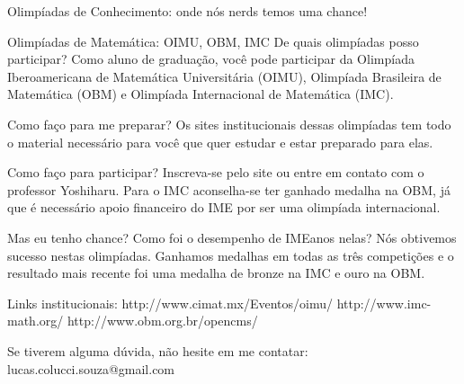 \begin{secao}{Olimpíadas de Conhecimento: onde nós nerds temos uma chance!}
\begin{subsecao}{Olimpíadas de Matemática: OIMU, OBM, IMC}
De quais olimpíadas posso participar? Como aluno de graduação, você pode
participar da Olimpíada Iberoamericana de Matemática Universitária (OIMU),
Olimpíada Brasileira de Matemática (OBM) e Olimpíada Internacional de 
Matemática (IMC).

Como faço para me preparar? Os sites institucionais dessas olimpíadas
tem todo o material necessário para você que quer estudar e estar preparado
para elas.

Como faço para participar? Inscreva-se pelo site ou entre em contato com
o professor Yoshiharu. Para o IMC aconselha-se ter ganhado medalha na OBM,
já que é necessário apoio financeiro do IME por ser uma olimpíada internacional.

Mas eu tenho chance? Como foi o desempenho de IMEanos nelas? Nós obtivemos
sucesso nestas olimpíadas. Ganhamos medalhas em todas as três competições e
o resultado mais recente foi uma medalha de bronze na IMC e ouro na OBM.

Links institucionais:
http://www.cimat.mx/Eventos/oimu/
http://www.imc-math.org/
http://www.obm.org.br/opencms/

Se tiverem alguma dúvida, não hesite em me contatar:
lucas.colucci.souza@gmail.com

\end{subsecao}

\end{secao}
